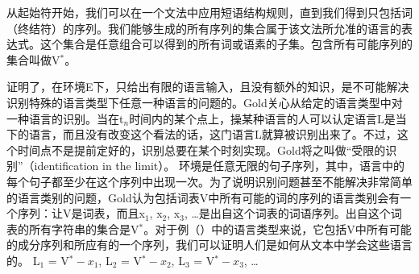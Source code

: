 从起始符开始，我们可以在一个文法中应用短语结构规则，直到我们得到只包括词（终结符）的序列。我们能够生成的所有序列的集合属于该文法所允准的语言的表达式。这个集合是任意组合可以得到的所有词或语素的子集。包含所有可能序列的集合叫做V$^*$。
  
\cite{Gold67a}证明了，在环境E下，只给出有限的语言输入，且没有额外的知识，是不可能解决识别特殊的语言类型下任意一种语言的问题的。Gold关心从给定的语言类型中对一种语言的识别。当在t$_n$时间内的某个点上，操某种语言的人可以认定语言L是当下的语言，而且没有改变这个看法的话，这门语言L就算被识别出来了。不过，这个时间点不是提前定好的，识别总要在某个时刻实现。Gold将之叫做“受限的识别”（identification in the limit）。
环境是任意无限的句子序列，其中，语言中的每个句子都至少在这个序列中出现一次。为了说明识别问题甚至不能解决非常简单的语言类别的问题，Gold认为包括词表V中所有可能的词的序列的语言类别会有一个序列：让V是词表，而且x$_1$, x$_2$, x$_3$, \ldots{}是出自这个词表的词语序列。出自这个词表的所有字符串的集合是V$^*$。对于例（）中的语言类型来说，它包括V中所有可能的成分序列和所应有的一个序列，我们可以证明人们是如何从文本中学会这些语言的。
\ea
L$_1$ = V$^* - x_1$, L$_2$ = V$^* - x_2$, L$_3$ = V$^* - x_3$, \ldots
\z

